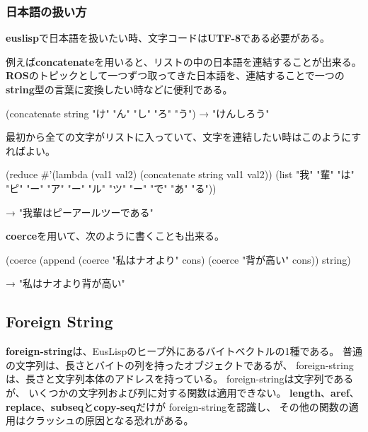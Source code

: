 \begin{refdesc}








\end{refdesc}

\subsubsection{日本語の扱い方}
{\bf euslisp}で日本語を扱いたい時、文字コードは{\bf UTF-8}である必要がある。

例えば{\bf concatenate}を用いると、リストの中の日本語を連結することが出来る。
{\bf ROS}のトピックとして一つずつ取ってきた日本語を、連結することで一つの{\bf string}型の言葉に変換したい時などに便利である。

(concatenate string "け" "ん" "し" "ろ" "う") 
→ "けんしろう"

最初から全ての文字がリストに入っていて、文字を連結したい時はこのようにすればよい。

(reduce {\#}'(lambda (val1 val2) (concatenate string val1 val2)) (list "我" "輩" "は" "ピ" "ー" "ア" "ー" "ル" "ツ" "ー" "で" "あ" "る"))

→ "我輩はピーアールツーである"

{\bf coerce}を用いて、次のように書くことも出来る。

(coerce (append (coerce "私はナオより" cons) (coerce "背が高い" cons)) string)

→ "私はナオより背が高い"

\subsection{Foreign String}
{\bf foreign-string}は、EusLispのヒープ外にあるバイトベクトルの1種である。
普通の文字列は、長さとバイトの列を持ったオブジェクトであるが、
foreign-stringは、長さと文字列本体のアドレスを持っている。
foreign-stringは文字列であるが、
いくつかの文字列および列に対する関数は適用できない。
{\bf length}、{\bf aref}、{\bf replace}、{\bf subseq}と{\bf copy-seq}だけが
foreign-stringを認識し、 
その他の関数の適用はクラッシュの原因となる恐れがある。

